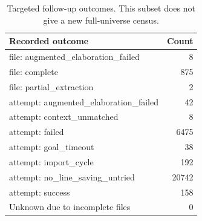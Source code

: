 \begin{table}[!htbp]\centering\small
\caption{Targeted follow-up outcomes. This subset does not give a new full-universe census.}
\begin{tabular}{lr}\toprule
Recorded outcome & Count\\\midrule
file: augmented\_elaboration\_failed & 8\\
file: complete & 875\\
file: partial\_extraction & 2\\
attempt: augmented\_elaboration\_failed & 42\\
attempt: context\_unmatched & 8\\
attempt: failed & 6475\\
attempt: goal\_timeout & 38\\
attempt: import\_cycle & 192\\
attempt: no\_line\_saving\_untried & 20742\\
attempt: success & 158\\
Unknown due to incomplete files & 0\\
\bottomrule\end{tabular}\end{table}
